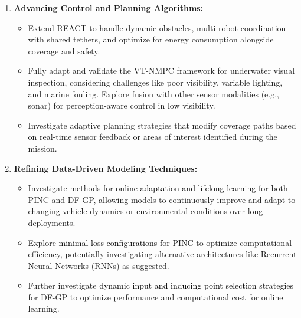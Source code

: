 \begin{enumerate}
    \item \textbf{Advancing Control and Planning Algorithms:}
        \begin{itemize}
            \item Extend REACT to handle dynamic obstacles, multi-robot coordination with shared tethers, and optimize for energy consumption alongside coverage and safety.
            \item Fully adapt and validate the VT-NMPC framework for underwater visual inspection, considering challenges like poor visibility, variable lighting, and marine fouling. Explore fusion with other sensor modalities (e.g., sonar) for perception-aware control in low visibility.
            \item Investigate adaptive planning strategies that modify coverage paths based on real-time sensor feedback or areas of interest identified during the mission.
        \end{itemize}

    \item \textbf{Refining Data-Driven Modeling Techniques:}
        \begin{itemize}
           
            \item Investigate methods for \textcolor{black}{online adaptation and lifelong learning} for both PINC and DF-GP, allowing models to continuously improve and adapt to changing vehicle dynamics or environmental conditions over long deployments.
            \item Explore \textcolor{black}{minimal loss configurations} for PINC to optimize computational efficiency, potentially investigating alternative architectures like Recurrent Neural Networks (RNNs) as suggested.
            \item Further investigate \textcolor{black}{dynamic input and inducing point selection} strategies for \ac{DF-GP} to optimize performance and computational cost for online learning.
        \end{itemize}


\end{enumerate}